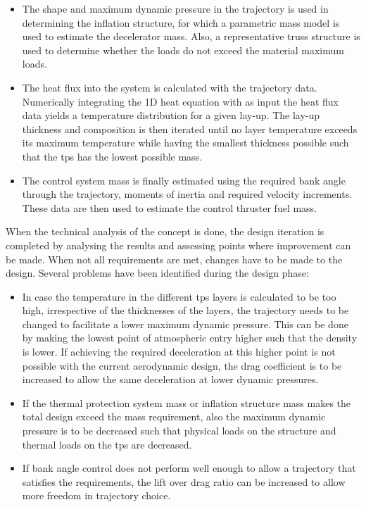 \begin{itemize}
	\item The shape and maximum dynamic pressure in the trajectory is used in determining the inflation structure, for which a parametric mass model is used to estimate the decelerator mass. Also, a representative truss structure is used to determine whether the loads do not exceed the material maximum loads.
	
	\item The heat flux into the system is calculated with the trajectory data. Numerically integrating the 1D heat equation with as input the heat flux data yields a temperature distribution for a given lay-up. The lay-up  thickness and composition is then iterated until no layer temperature exceeds its maximum temperature while having the smallest thickness possible such that the \gls{tps} has the lowest possible mass.
	
	\item The control system mass is finally estimated using the required bank angle through the trajectory, moments of inertia and required velocity increments. These data are then used to estimate the control thruster fuel mass.
\end{itemize}



When the technical analysis of the concept is done, the design iteration is completed by analysing the results and assessing points where improvement can be made. When not all requirements are met, changes have to be made to the design. Several problems have been identified during the design phase:


\begin{itemize}
	\item In case the temperature in the different \gls{tps} layers is calculated to be too high, irrespective of the thicknesses of the layers, the trajectory needs to be changed to facilitate a lower maximum dynamic pressure. This can be done by making the lowest point of atmospheric entry higher such that the density is lower. If achieving the required deceleration at this higher point is not possible with the current aerodynamic design, the drag coefficient is to be increased to allow the same deceleration at lower dynamic pressures.
	
	\item If the thermal protection system mass or inflation structure mass makes the total design exceed the mass requirement, also the maximum dynamic pressure is to be decreased such that physical loads on the structure and thermal loads on the \gls{tps} are decreased.
	
	\item If bank angle control does not perform well enough to allow a trajectory that satisfies the requirements, the lift over drag ratio can be increased to allow more freedom in trajectory choice.
	
	
\end{itemize}



